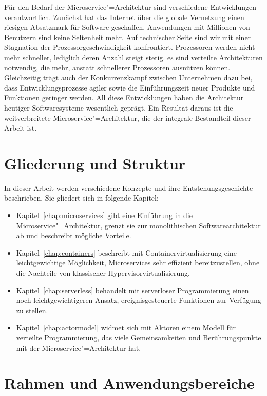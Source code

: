 Für den Bedarf der Microservice"=Architektur sind verschiedene Entwicklungen verantwortlich. Zunächst hat das Internet über die globale Vernetzung einen riesigen Absatzmark für Software geschaffen. Anwendungen mit Millionen von Benutzern sind keine Seltenheit mehr. Auf technischer Seite sind wir mit einer Stagnation der Prozessorgeschwindigkeit konfrontiert. Prozessoren werden nicht mehr schneller, lediglich deren Anzahl steigt stetig. \Dah es sind verteilte Architekturen notwendig, die mehr, anstatt schnellerer Prozessoren ausnützen können. Gleichzeitig trägt auch der Konkurrenzkampf zwischen Unternehmen dazu bei, dass Entwicklungsprozesse agiler sowie die Einführungszeit neuer Produkte und Funktionen geringer werden. All diese Entwicklungen haben die Architektur heutiger Softwaresysteme wesentlich geprägt. Ein Resultat daraus ist die weitverbreitete Microservice"=Architektur, die der integrale Bestandteil dieser Arbeit ist.

\section{Gliederung und Struktur}

In dieser Arbeit werden verschiedene Konzepte und ihre Entstehungsgeschichte beschrieben. Sie gliedert sich in folgende Kapitel:

\begin{itemize}
	\item Kapitel~\ref{chap:microservices} gibt eine Einführung in die Microservice"=Architektur, grenzt sie zur monolithischen Softwarearchitektur ab und beschreibt mögliche Vorteile.
	\item Kapitel~\ref{chap:containers} beschreibt mit Containervirtualisierung eine leichtgewichtige Möglichkeit, Microservices sehr effizient bereitzustellen, ohne die Nachteile von klassischer Hypervisorvirtualisierung.
	\item Kapitel~\ref{chap:serverless} behandelt mit serverloser Programmierung einen noch leichtgewichtigeren Ansatz, ereignisgesteuerte Funktionen zur Verfügung zu stellen. 
	\item Kapitel~\ref{chap:actormodel} widmet sich mit Aktoren einem Modell für verteilte Programmierung, das viele Gemeinsamkeiten und Berührungspunkte mit der Microservice"=Architektur hat.
\end{itemize}

\section{Rahmen und Anwendungsbereiche}

